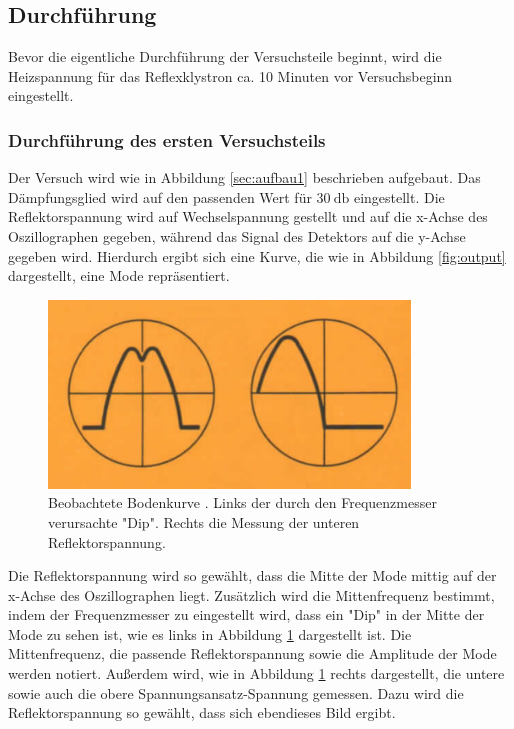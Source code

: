 \subsection{Durchführung}
\label{sec:durchführung}
Bevor die eigentliche Durchführung der Versuchsteile beginnt, wird die Heizspannung für das Reflexklystron ca. 10 Minuten vor Versuchsbeginn eingestellt.

\subsubsection{Durchführung des ersten Versuchsteils}
Der Versuch wird wie in Abbildung \ref{sec:aufbau1} beschrieben aufgebaut.
Das Dämpfungsglied wird auf den passenden Wert für $\SI{30}{\decibel}$ eingestellt.
Die Reflektorspannung wird auf Wechselspannung gestellt und auf die x-Achse des Oszillographen gegeben, während das Signal des Detektors auf die y-Achse gegeben wird.
Hierdurch ergibt sich eine Kurve, die wie in Abbildung \ref{fig:output} dargestellt, eine Mode repräsentiert.

\begin{figure}
  \centering
  \includegraphics[height=5cm]{ressources/df1.png}
  \caption{Beobachtete Bodenkurve \cite{skript}. Links der durch den Frequenzmesser verursachte "Dip". Rechts die Messung der unteren Reflektorspannung. }
  \label{fig:df1}
\end{figure}

Die Reflektorspannung wird so gewählt, dass die Mitte der Mode mittig auf der x-Achse des Oszillographen liegt.
Zusätzlich wird die Mittenfrequenz bestimmt, indem der Frequenzmesser zu eingestellt wird, dass ein "Dip" in der Mitte der Mode zu sehen ist, wie es links in Abbildung \ref{fig:df1} dargestellt ist.
Die Mittenfrequenz, die passende Reflektorspannung sowie die Amplitude der Mode werden notiert.
Außerdem wird, wie in Abbildung \ref{fig:df1} rechts dargestellt, die untere sowie auch die obere Spannungsansatz-Spannung gemessen.
Dazu wird die Reflektorspannung so gewählt, dass sich ebendieses Bild ergibt.

